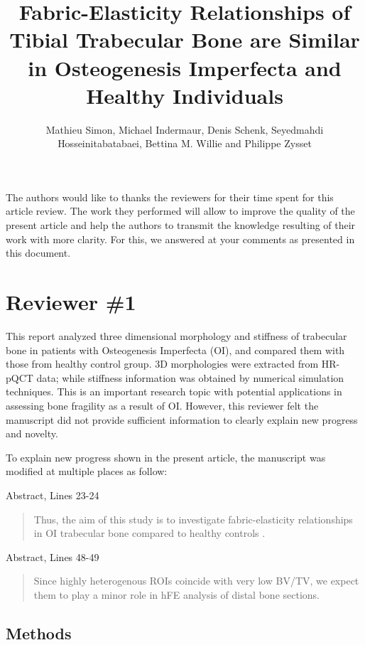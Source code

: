 \documentclass{AR2RC}
\title{Fabric-Elasticity Relationships of Tibial Trabecular Bone are Similar in Osteogenesis Imperfecta and Healthy Individuals}
\author{Mathieu Simon, Michael Indermaur, Denis Schenk, Seyedmahdi Hosseinitabatabaei, Bettina	M. Willie and Philippe Zysset}
\begin{document}
\maketitle

\vspace{1em}The authors would like to thanks the reviewers for their time spent for this article review. The work they performed will allow to improve the quality of the present article and help the authors to transmit the knowledge resulting of their work with more clarity. For this, we answered at your comments as presented in this document.

\section{Reviewer \#1}

\RC This report analyzed three dimensional morphology and stiffness of trabecular bone in patients with Osteogenesis Imperfecta (OI), and compared them with those from healthy control group. 3D morphologies were extracted from HR-pQCT data; while stiffness information was obtained by numerical simulation techniques. This is an important research topic with potential applications in assessing bone fragility as a result of OI. However, this reviewer felt the manuscript did not provide sufficient information to clearly explain new progress and novelty.

\AR To explain new progress shown in the present article, the manuscript was modified at multiple places as follow:\par

Abstract, Lines 23-24
\begin{quote}
	Thus, the aim of this study is to investigate fabric-elasticity relationships in OI trabecular bone compared to healthy controls .
\end{quote}

Abstract, Lines 48-49
\begin{quote}
	 Since highly heterogenous ROIs coincide with very low BV/TV, we expect them to play a minor role in hFE analysis of distal bone sections. 
\end{quote}

\subsection{Methods}
\end{document}
